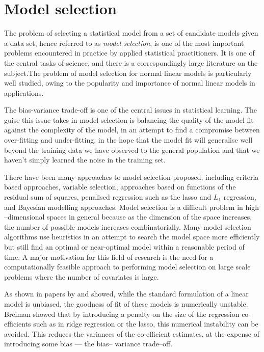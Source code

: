 \section{Model selection}
The problem of selecting a statistical model from a set of candidate models given a data set, hence referred
to as \emph{model selection}, is one of the most important problems encountered in practice by applied
statistical practitioners. It is one of the central tasks of science, and there is a correspondingly large
literature on the subject.The problem of model selection for normal linear models is particularly well
studied, owing to the popularity and importance of normal linear models in applications.

The bias-variance trade-off is one of the central issues in statistical learning. The guise this issue takes
in model selection is balancing the quality of the model fit against the complexity of the model, in an
attempt to find a compromise between over-fitting and under-fitting, in the hope that the model fit will
generalise well beyond the training data we have observed to the general population and that we haven't simply
learned the noise in the training set.

There have been many approaches to model selection proposed, including criteria based approaches, variable
selection, approaches based on functions of the residual sum of squares, penalised regression such as the
lasso and $L_1$ regression, and Bayesian modelling approaches. Model selection is a difficult problem in high
--dimensional spaces in general because as the dimension of the space increases, the number of possible models
increases combinatorially. Many model selection algorithms use heuristics in an attempt to search the model
space more efficiently but still find an optimal or near-optimal model within a reasonable period of time. A
major motivation for this field of research is the need for a computationally feasible approach to performing
model selection on large scale problems where the number of covariates is large.

As shown in papers by \citep{Breiman1996} and \citep{Efron2013} showed, while the standard formulation of a
linear model is unbiased, the goodness of fit of these models is numerically  unstable. Breiman showed that by
introducing a penalty on the size of the regression co- efficients such as  in ridge regression or the lasso,
this numerical instability can be avoided. This reduces the variances of the co-efficient estimates, at the
expense of introducing some bias --- the bias-- variance trade--off.

